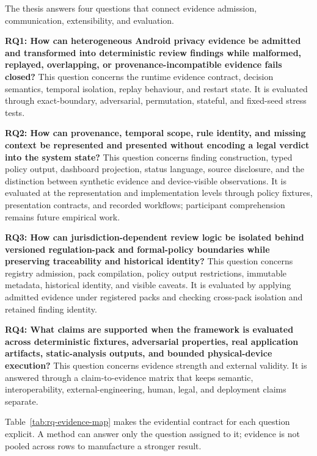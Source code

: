 The thesis answers four questions that connect evidence admission, communication, extensibility, and evaluation.

\textbf{RQ1: How can heterogeneous Android privacy evidence be admitted and transformed into deterministic review findings while malformed, replayed, overlapping, or provenance-incompatible evidence fails closed?} This question concerns the runtime evidence contract, decision semantics, temporal isolation, replay behaviour, and restart state. It is evaluated through exact-boundary, adversarial, permutation, stateful, and fixed-seed stress tests.

\textbf{RQ2: How can provenance, temporal scope, rule identity, and missing context be represented and presented without encoding a legal verdict into the system state?} This question concerns finding construction, typed policy output, dashboard projection, status language, source disclosure, and the distinction between synthetic evidence and device-visible observations. It is evaluated at the representation and implementation levels through policy fixtures, presentation contracts, and recorded workflows; participant comprehension remains future empirical work.

\textbf{RQ3: How can jurisdiction-dependent review logic be isolated behind versioned regulation-pack and formal-policy boundaries while preserving traceability and historical identity?} This question concerns registry admission, pack compilation, policy output restrictions, immutable metadata, historical identity, and visible caveats. It is evaluated by applying admitted evidence under registered packs and checking cross-pack isolation and retained finding identity.

\textbf{RQ4: What claims are supported when the framework is evaluated across deterministic fixtures, adversarial properties, real application artifacts, static-analysis outputs, and bounded physical-device execution?} This question concerns evidence strength and external validity. It is answered through a claim-to-evidence matrix that keeps semantic, interoperability, external-engineering, human, legal, and deployment claims separate.

Table~\ref{tab:rq-evidence-map} makes the evidential contract for each question explicit. A method can answer only the question assigned to it; evidence is not pooled across rows to manufacture a stronger result.

